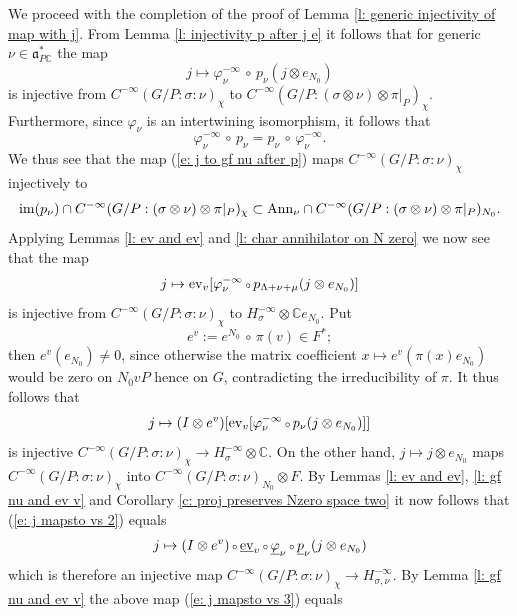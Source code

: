 \documentclass[12pt,a4paper]{article}
\def\msy#1{{\mathbb #1}}
\def\C{{\msy C}}
\def\gf{\varphi}
\def\gs{\sigma}
\def\got#1{\mathfrak #1}
\def\fa{{\got a}}
\def\to{\rightarrow}
\def\after{\,{\scriptstyle\circ}\,}
\def\iC{{\scriptscriptstyle \C}}
\numberwithin{Thm}{section}
\numberwithin{equation}{section}
\def\ev{{\rm ev}}
\def\faPdc{{\fa_{P\iC}^*}}
\def\gL{\Lambda}
\numberwithin{equation}{section}
\def\gL{\Lambda}
\def\faPdc{\fa_{P\iC}^*}
\def\cchi{\chi}
\begin{document}
We proceed with the completion of the proof of Lemma \ref{l: generic injectivity of map with j}. 
From Lemma \ref{l: injectivity p after j e} it follows that for generic $\nu \in \faPdc$ 
the map
\begin{equation}
\label{e: j to gf nu after p} 
j \mapsto   \gf_\nu^{-\infty} \after p_{\nu} (j \otimes e_{N_0})
\end{equation}
is injective from $C^{-\infty}(G/P:\gs:\nu)_\cchi$ to 
$C^{-\infty}(G /P: (\gs\otimes\nu) \otimes \pi|_P)_\cchi.$
Furthermore, since $\gf_\nu$ is an intertwining isomorphism,
it follows that  
$$ 
\gf_\nu^{-\infty} \after p_{\nu } = p_{\nu} \after \gf_\nu^{-\infty}.
$$ 
We thus see that the map (\ref{e: j to gf nu after p}) maps $C^{-\infty}(G/P:\gs:\nu)_\cchi$
injectively 
to 
$$ 
{\rm im}(p_\nu) \cap C^{-\infty}(G/P: (\gs \otimes \nu) \otimes\pi|_P)_\cchi
\subset {\rm Ann}_\nu \cap C^{-\infty}(G/P: (\gs \otimes \nu) \otimes\pi|_P)_{N_0}.
$$ 
Applying Lemmas \ref{l: ev and ev} and \ref{l: char annihilator on N zero}
we now
see that the map 
$$ 
j \mapsto   \ev_v [ \gf_\nu^{-\infty} \after p_{\gL +\nu + \mu} (j \otimes e_{N_0})]
$$
is injective from   $C^{-\infty}(G/P:\gs:\nu)_\cchi$ to $H_{\gs}^{-\infty}\otimes \C e_{N_0}.$
Put 
\begin{equation}
e^v:= e^{N_0} \after \pi(v) \in F^*;
\end{equation}
then $e^v(e_{N_0}) \neq 0$, since otherwise
the matrix coefficient $x \mapsto e^v(\pi(x) e_{N_0})$ would be zero
on $N_0 vP$ hence on $G$, contradicting
the irreducibility of $\pi.$ It thus follows that 
\begin{equation}
\label{e: j mapsto vs 2}
j \mapsto   (I \otimes e^v) [ \ev_v  [ \gf_\nu^{-\infty} \after p_{\nu} (j \otimes e_{N_0}) ]]
\end{equation}
is injective  $C^{-\infty}(G/P:\gs:\nu)_\cchi \to H_{\gs}^{-\infty}\otimes \C.$
On the other hand, $j \mapsto j \otimes e_{N_0}$ maps
$C^{-\infty}(G/P:\gs:\nu)_\cchi$ into $C^{-\infty}(G/P:\gs : \nu)_{N_0} \otimes F.$ 
By Lemmas \ref{l: ev and ev}, \ref{l: gf nu and ev v} and Corollary \ref{c: proj preserves Nzero space two} 
it now follows that (\ref{e: j mapsto vs 2}) equals
\begin{equation}
\label{e: j mapsto vs 3}
j \mapsto (I \otimes e^v)\after \underline{\ev}_v \after \underline\gf_\nu \after  \underline p_\nu (j \otimes e_{N_0})
\end{equation}
which is therefore  an injective map 
$C^{-\infty}(G/P:\gs:\nu)_\cchi \to H_{\gs, \nu}^{-\infty}.$ 
By Lemma \ref{l: gf nu and ev v} the above map (\ref{e: j mapsto vs 3}) equals
\end{document}
